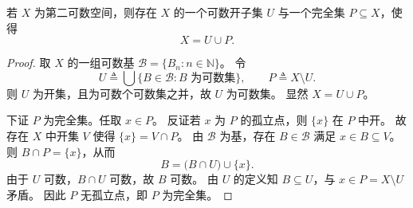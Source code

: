\documentclass[lang=cn,a4paper,newtx,figureplace=section,tableplace=section]{elegantbook}
\begin{document}
\begin{lemma}\label{lem:second-countable-decomposition}
  若 $X$ 为第二可数空间，则存在 $X$ 的一个可数开子集 $U$ 与一个完全集 $P\subseteq X$，使得
  \[
    X=U\cup P.
  \]
\end{lemma}
\begin{proof}
  取 $X$ 的一组可数基 $\mathcal{B}=\{B_n:n\in\mathbb{N}\}$。
  令
  \[
    U\triangleq\bigcup\{B\in\mathcal{B}: B\text{ 为可数集}\},\qquad P\triangleq X\setminus U.
  \]
  则 $U$ 为开集，且为可数个可数集之并，故 $U$ 为可数集。
  显然 $X=U\cup P$。

  下证 $P$ 为完全集。任取 $x\in P$。
  反证若 $x$ 为 $P$ 的孤立点，则 $\{x\}$ 在 $P$ 中开。
  故存在 $X$ 中开集 $V$ 使得 $\{x\}=V\cap P$。
  由 $\mathcal{B}$ 为基，存在 $B\in\mathcal{B}$ 满足 $x\in B\subseteq V$。
  则 $B\cap P=\{x\}$，从而
  \[
    B=\bigl(B\cap U\bigr)\cup\{x\}.
  \]
  由于 $U$ 可数，$B\cap U$ 可数，故 $B$ 可数。
  由 $U$ 的定义知 $B\subseteq U$，与 $x\in P=X\setminus U$ 矛盾。
  因此 $P$ 无孤立点，即 $P$ 为完全集。
\end{proof}
\end{document}
